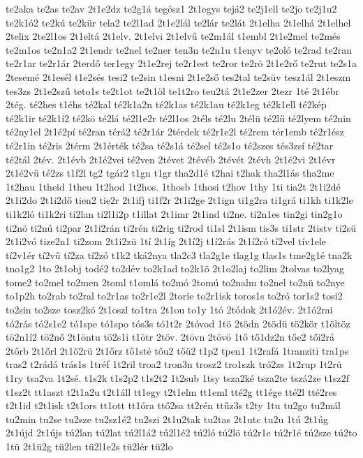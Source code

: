{te2aka
te2as
te2av
2t1e2dz
te2g1á
tegész1
2t1egys
tejá2
te2j1ell
te2jo
te2j1u2
te2k1ó2
te2kú
te2kür
tela2
te2l1ad
2t1e2lál
te2lár
te2lát
2t1elha
2t1elhá
2t1elhel
2telix
2te2l1os
2t1eltá
2t1elv.
2t1elvi
2t1elvű
te2m1ál
t1embl
2t1e2mel
te2més
te2m1os
te2n1a2
2t1endr
te2nel
te2ner
ten3n
te2n1u
t1enyv
te2oló
te2rad
te2ran
te2r1ar
te2r1ár
2terdő
ter1egy
2t1e2rej
te2r1est
te2ror
te2rö
2t1e2rő
te2rut
te2s1a
2tesemé
2t1esél
t1e2sés
tesi2
te2sin
t1esni
2t1e2ső
tes2tal
te2süv
tesz1ál
2t1eszm
tes3zs
2t1e2szű
teto1s
te2t1ot
te2t1öl
te1t2ro
teu2tá
2t1e2zer
2tezr
1té
2t1ébr
2tég.
té2hes
t1éhs
té2kal
té2k1a2n
té2k1as
té2k1au
té2k1eg
té2k1ell
té2kép
té2k1ir
té2k1í2
té2kö
té2lá
té2l1e2r
té2l1os
2téls
té2lu
2télü
té2lű
té2lyem
té2nin
té2ny1el
2t1é2pí
té2ran
térá2
té2r1ár
2térdek
té2r1e2l
té2rem
tér1emb
té2r1ész
té2r1in
té2ris
2térm
2t1érték
té2sa
té2s1á
té2sel
té2s1o
té2szes
tés3zsí
té2tar
té2tál
2tév.
2t1évb
2t1é2vei
té2ven
2tévet
2tévéb
2tévét
2tévh
2t1é2vi
2t1évr
2t1é2vü
té2zs
t1f2l
tg2
tgár2
t1gn
t1gr
tha2d1é
t2hai
t2hak
tha2l1ás
tha2me
1t2hau
1theid
1theu
1t2hod
1t2hos.
1thosb
1thosi
t2hov
1thy
1ti
tia2t
2t1i2dé
2t1i2do
2t1i2dő
tien2
tie2r
2t1ifj
ti1f2r
2t1i2ge
2t1ign
ti1g2ra
ti1grá
ti1kh
ti1k2le
ti1k2ló
ti1k2ri
ti2lan
ti2l1i2p
t1illat
2t1imr
2t1ind
ti2ne.
ti2n1es
tin2gi
tin2g1o
ti2nö
ti2nú
ti2par
2t1i2rán
ti2rén
ti2rig
ti2rod
ti1sl
2t1ism
tis3s
ti1str
2tistv
ti2sü
2t1i2vó
tize2n1
ti2zom
2t1i2zü
1tí
2t1íg
2t1í2j
t1í2rás
2t1í2ró
tí2vel
tív1ele
tí2v1ér
tí2vű
tí2za
tí2zó
t1k2
tká2nya
tla2c3
tla2g1e
tlag1g
tlas1s
tme2g1é
tna2k
tno1g2
1to
2t1obj
todé2
to2dév
to2k1ad
to2k1ö
2t1o2laj
to2lim
2tolvas
to2lyag
tome2
to2mel
to2men
2toml
t1omlá
to2mó
2tomú
to2nalm
to2nel
to2nü
to2nye
to1p2h
to2rab
to2ral
to2r1as
to2r1e2l
2torie
to2r1isk
toros1s
to2ró
tor1s2
tosi2
to2sin
to2sze
tosz2kó
2t1oszl
to1tra
2t1ou
to1y
1tó
2tódok
2t1ó2év.
2t1ó2rai
tó2rás
tó2s1e2
tó1spe
tó1spo
tós3s
tó1t2r
2tóvod
1tö
2tödn
2tödü
tö2kör
t1öltöz
tö2n1í2
tö2nő
2t1öntu
tö2s1i
t1ötr
2töv.
2tövn
2tövö
1tő
tő1dz2n
tőe2
tői2rá
2tőrb
2t1őrl
2t1ő2rü
2t1őrz
tő1sté
tőu2
tőü2
t1p2
tpen1
1t2rafá
1tranziti
tra1ps
tras2
t2rádá
trás1s
1tréf
1t2ril
troa2
tron3n
trosz2
tro1szk
tró2zs
1t2rup
1t2rü
t1ry
tsa2va
1t2sé.
t1s2k
t1s2p2
t1s2t2
1t2sub
1tsy
tsza2ké
tsza2te
tszá2ze
t1sz2f
t1sz2t
tt1aszt
t2t1a2u
t2t1áll
tt1egy
t2t1elm
tt1eml
tté2g
tt1ége
tté2l
tté2res
t2t1id
t2t1isk
t2t1ors
tt1ott
tt1óra
ttő2sa
tt2rén
ttűz3s
t2ty
1tu
tu2go
tu2mál
tu2min
tu2se
tu2sze
tu2sz1é2
tu2szi
2t1u2tak
tu2tas
2t1utc
tu2u
1tú
2t1úg
2t1újd
2t1újs
tú2lan
tú2lat
tú2l1á2
tú2l1é2
tú2ló
tú2lö
tú2r1e
tú2r1é
tú2sze
tú2to
1tü
2t1ü2g
tü2len
tü2l1e2s
tü2lér
tü2lo
}
